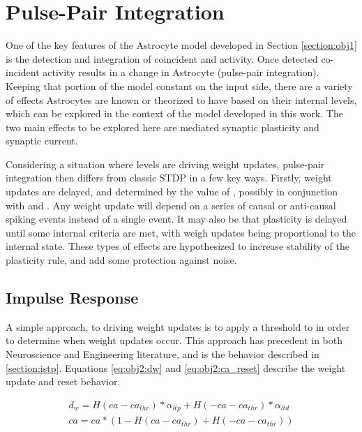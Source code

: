 
\section{Pulse-Pair Integration}

One of the key features of the Astrocyte model developed in Section
\ref{section:obj1} is the detection and integration of coincident \ipt and \kp
activity. Once detected co-incident activity results in a change in Astrocyte
\ca (pulse-pair integration). Keeping that portion of the model constant on the
input side, there are a variety of effects Astrocytes are known or theorized to
have based on their internal \ca levels, which can be explored in the context of
the model developed in this work. The two main effects to be explored here are
\ca mediated synaptic plasticity and synaptic current.

Considering a situation where \ca levels are driving weight updates, pulse-pair
integration then differs from classic STDP in a few key ways. Firstly, weight
updates are delayed, and determined by the value of \ca, possibly in conjunction
with \ipt and \kp. Any weight update will depend on a series of causal or
anti-causal spiking events instead of a single event. It may also be that
plasticity is delayed until some internal criteria are met, with weigh updates
being proportional to the internal state. These types of effects are
hypothesized to increase stability of the plasticity rule, and add some
protection against noise.


\subsection{Impulse Response}
A simple approach, to driving weight updates is to apply a threshold to \ca in
order to determine when weight updates occur. This approach has precedent in
both Neuroscience and Engineering literature, and is the behavior described in
\ref{section:istp}. Equations \ref{eq:obj2:dw} and \ref{eq:obj2:ca_reset}
describe the weight update and \ca reset behavior.


\begin{align}
  d_w = H(ca - ca_{thr}) * \alpha_{ltp} + H(-ca - ca_{thr}) *
  \alpha_{ltd} \label{eq:obj2:dw} \\
  ca = ca * (1 - H(ca - ca_{thr}) +  H(-ca - ca_{thr})) \label{eq:obj2:ca_reset}
\end{align}


